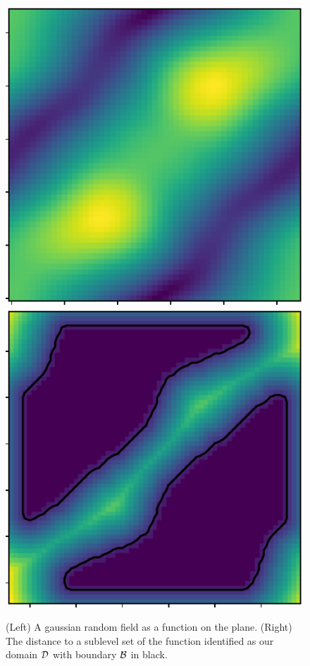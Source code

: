 \begin{figure}[htbp]
\centering
    \includegraphics[scale=0.85]{figures/hsn_field.pdf}\hspace{0.5in}
    \includegraphics[scale=0.8]{figures/hsn_boundary.pdf}
    \caption{(Left) A gaussian random field as a function on the plane.
            (Right) The distance to a sublevel set of the function identified as our domain ${\mathcal{D}}$ with boundary ${\mathcal{B}}$ in black.}
    \label{fig:hsn}
\end{figure}


